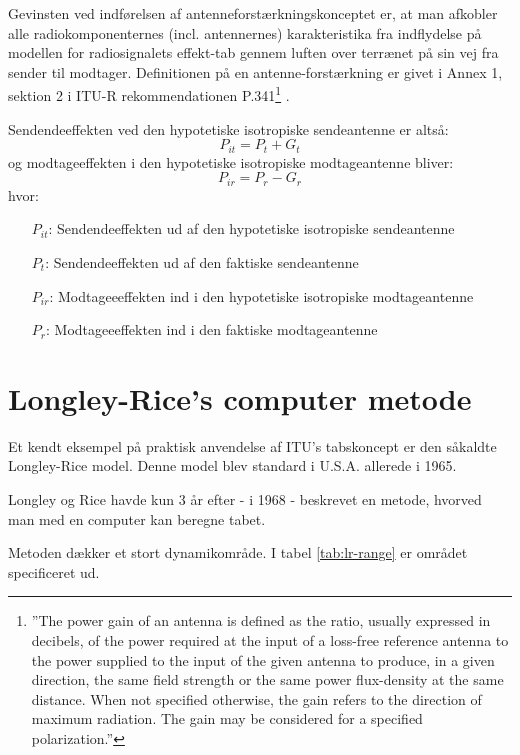 Gevinsten ved indførelsen af antenneforstærkningskonceptet er, at man afkobler alle radiokomponenternes (incl. antennernes) karakteristika fra indflydelse på modellen for radiosignalets effekt-tab gennem luften over terrænet på sin vej fra sender til modtager. Definitionen på en antenne-forstærkning er givet i Annex 1, sektion 2 i ITU-R rekommendationen P.341\footnote{''The power gain of an antenna is defined as the ratio, usually expressed in decibels, of the power required at the input of a loss-free reference antenna to the power supplied to the input of the given antenna to produce, in a given direction, the same field strength or the same power flux-density at the same distance. When not specified otherwise, the gain refers to the direction of maximum radiation. The gain may be considered for a specified polarization.''} \cite{itur_p341-5}.

Sendendeeffekten ved den hypotetiske isotropiske sendeantenne er altså:
\begin{equation}
P_{it} = P_{t}+ G_t
\end{equation}
og modtageeffekten i den hypotetiske isotropiske modtageantenne bliver:
\begin{equation}
P_{ir} = P_{r}- G_r
\end{equation}
hvor:
\begin{itemize}[]
 \item [$P_{it}$:] Sendendeeffekten ud af den hypotetiske isotropiske sendeantenne 
 \item [$P_{t}$:] Sendendeeffekten ud af den faktiske sendeantenne
 \item [$P_{ir}$:] Modtageeeffekten ind i den hypotetiske isotropiske modtageantenne
 \item [$P_{r}$:] Modtageeeffekten ind i den faktiske modtageantenne
\end{itemize}

\section{Longley-Rice's computer metode}
Et kendt eksempel på praktisk anvendelse af ITU's tabskoncept er den såkaldte Longley-Rice model. Denne model blev standard i U.S.A. allerede i 1965\cite{nbs-tn101}.

Longley og Rice havde kun 3 år efter - i 1968 - beskrevet en metode, hvorved man med en computer kan beregne tabet\cite{ntis-ad676874}.

Metoden dækker et stort dynamikområde. I tabel \ref{tab:lr-range} er området specificeret ud.

